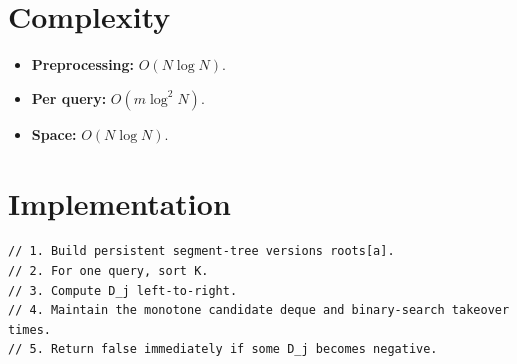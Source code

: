 \documentclass[11pt,a4paper]{article}
\begin{document}
\section{Complexity}
\begin{itemize}
  \item \textbf{Preprocessing:} $O(N \log N)$.
  \item \textbf{Per query:} $O(m \log^2 N)$.
  \item \textbf{Space:} $O(N \log N)$.
\end{itemize}

\section{Implementation}
\begin{lstlisting}
// 1. Build persistent segment-tree versions roots[a].
// 2. For one query, sort K.
// 3. Compute D_j left-to-right.
// 4. Maintain the monotone candidate deque and binary-search takeover times.
// 5. Return false immediately if some D_j becomes negative.
\end{lstlisting}
\end{document}
